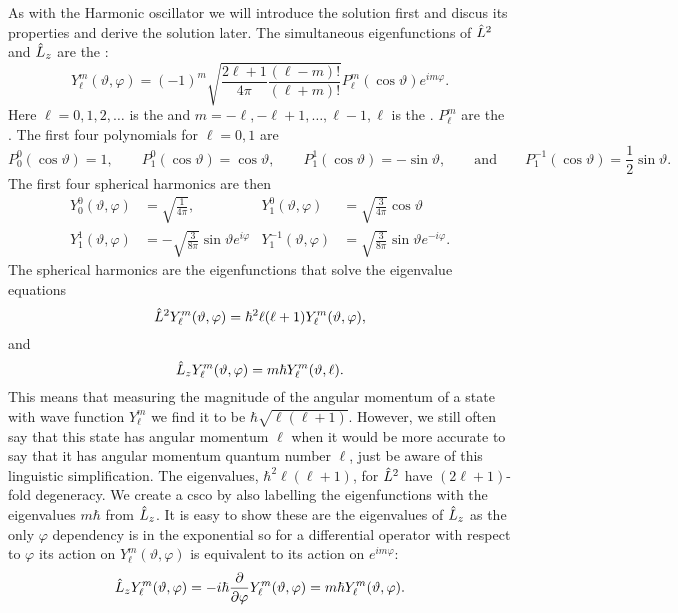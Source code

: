 As with the Harmonic oscillator we will introduce the solution first and discus its properties and derive the solution later.
The simultaneous eigenfunctions of \(\hat{L}^2\) and \(\hat{L}_z\) are the :
\[Y^m_\ell(\vartheta, \varphi) = (-1)^m\sqrt{\frac{2\ell + 1}{4\pi}\frac{(\ell - m)!}{(\ell + m)!}} P^m_\ell(\cos\vartheta)e^{im\varphi}.\]
Here \(\ell = 0, 1, 2, \dotsc\) is the  and \(m = -\ell, -\ell + 1, \dotsc, \ell - 1, \ell\) is the .
\(P_\ell^m\) are the .
The first four polynomials for \(\ell = 0, 1\) are
\[P_0^0(\cos\vartheta) = 1, \qquad P_1^0(\cos\vartheta) = \cos\vartheta, \qquad P_1^1(\cos\vartheta) = -\sin\vartheta, \qquad\text{and}\qquad P_1^{-1}(\cos\vartheta) = \frac{1}{2}\sin\vartheta.\]
The first four spherical harmonics are then
\begin{align*}
    Y_0^0(\vartheta, \varphi) &= \sqrt{\frac{1}{4\pi}}, \qquad & Y_1^0(\vartheta, \varphi) &= \sqrt{\frac{3}{4\pi}}\cos\vartheta\\
    Y_1^1(\vartheta, \varphi) &= -\sqrt{\frac{3}{8\pi}}\sin\vartheta e^{i\varphi} & 
    Y_1^{-1}(\vartheta, \varphi) &= \sqrt{\frac{3}{8\pi}}\sin\vartheta e^{-i\varphi}.
\end{align*}
The spherical harmonics are the eigenfunctions that solve the eigenvalue equations
\[\hat{L}^2Y_\ell^m(\vartheta, \varphi) = \hbar^2\ell(\ell + 1)Y_\ell^m(\vartheta, \varphi),\]
and
\[\hat{L}_zY_\ell^m(\vartheta, \varphi) = m\hbar Y_\ell^m(\vartheta, \ell).\]
This means that measuring the magnitude of the angular momentum of a state with wave function \(Y_\ell^m\) we find it to be \(\hbar\sqrt{\ell(\ell + 1)}\).
However, we still often say that this state has angular momentum \(\ell\) when it would be more accurate to say that it has angular momentum quantum number \(\ell\), just be aware of this linguistic simplification.
The eigenvalues, \(\hbar^2\ell(\ell + 1)\), for \(\hat{L}^2\) have \((2\ell + 1)\)-fold degeneracy.
We create a \gls{csco} by also labelling the eigenfunctions with the eigenvalues \(m\hbar\) from \(\hat{L}_z\).
It is easy to show these are the eigenvalues of \(\hat{L}_z\) as the only \(\varphi\) dependency is in the exponential so for a differential operator with respect to \(\varphi\) its action on \(Y_\ell^m(\vartheta, \varphi)\) is equivalent to its action on  \(e^{im\varphi}\):
\[\hat{L}_zY_\ell^m(\vartheta, \varphi) = -i\hbar\pdv{\varphi}Y_\ell^m(\vartheta, \varphi) = m\hbar Y_\ell^m(\vartheta, \varphi).\]

